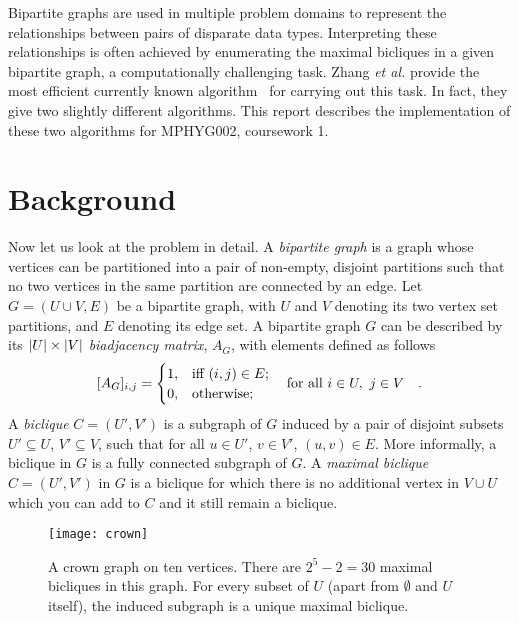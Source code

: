 Bipartite graphs are used in multiple problem domains to represent the relationships between pairs of disparate data types.
Interpreting these relationships is often achieved by enumerating the maximal bicliques in a given bipartite graph, a computationally challenging task.
Zhang \emph{et al.} provide the most efficient currently known algorithm~\cite{Zhang2014} for carrying out this task.
In fact, they give two slightly different algorithms.
This report describes the implementation of these two algorithms for MPHYG002, coursework 1.

\section{Background}
Now let us look at the problem in detail.
A \emph{bipartite graph} is a graph whose vertices can be partitioned into a pair of non-empty, disjoint partitions such that no two vertices in the same partition are connected by an edge.
Let $G= (U\cup V, E)$ be a bipartite graph, with $U$ and $V$ denoting its two vertex set partitions, and $E$ denoting its edge set.
A bipartite graph $G$ can be described by its $\abs{U}\times \abs{V}$ \emph{biadjacency matrix}, $A_G$, with elements defined as follows
\begin{equation}\label{eq:biadjacency}
    [A_G]_{i,j} = \begin{cases}
    1, & \text{iff $(i,j)\in E$};\\
    0, & \text{otherwise};
\end{cases}
\qq{for all $i\in U,\ j \in V$}. 
\end{equation}
A \emph{biclique} $C = (U', V')$ is a subgraph of $G$ induced by a pair of disjoint subsets $U'\subseteq U$, $V' \subseteq V$, such that for all $u\in U'$, $v \in V'$, $(u,v)\in E$.
More informally, a biclique in $G$ is a fully connected subgraph of $G$.
A \emph{maximal biclique} $C = (U',V')$ in $G$ is a biclique for which there is no additional vertex in $V\cup U$ which you can add to $C$ and it still remain a biclique.

\begin{wrapfigure}{r}{0.5\textwidth}
    \centering
    \texttt{[image: crown]}
    \caption{
    A crown graph on ten vertices.
    There are $2^{5}-2 = 30$ maximal bicliques in this graph.
    For every subset of $U$ (apart from $\emptyset$ and $U$ itself), the induced subgraph is a unique maximal biclique. 
    }
    \label{fig:crown}
\end{wrapfigure}

